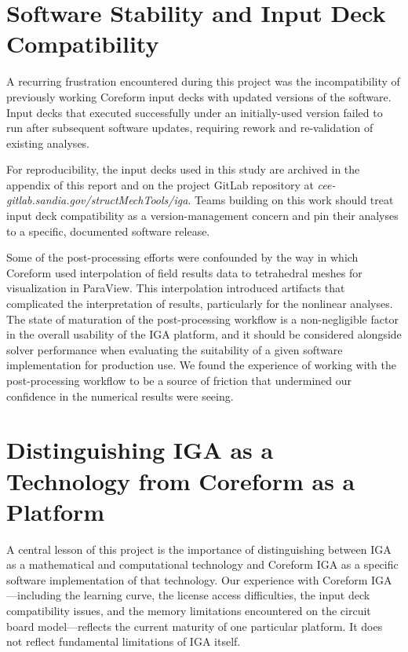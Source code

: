 \documentclass[12pt,report,justified]{SANDreport}
\begin{document}
\section{Software Stability and Input Deck Compatibility}

A recurring frustration encountered during this project was the incompatibility of
previously working Coreform input decks with updated versions of the software.  Input
decks that executed successfully under an initially-used version
failed to run after
subsequent software updates, requiring rework and re-validation of existing analyses.

For reproducibility, the input decks used in this study are archived in the appendix of
this report and on the project GitLab repository at
{\em cee-gitlab.sandia.gov/structMechTools/iga}.  Teams building on this work should
treat input deck compatibility as a version-management concern and pin their analyses to
a specific, documented software release.

Some of the post-processing efforts were confounded by the way in which Coreform used interpolation of field results data to tetrahedral meshes for visualization in ParaView.  This interpolation introduced artifacts that complicated the interpretation of results, particularly for the nonlinear analyses.  The state of maturation of the post-processing workflow is a non-negligible factor in the overall usability of the IGA platform, and it should be considered alongside solver performance when evaluating the suitability of a given software implementation for production use.  We found the experience of working with the post-processing workflow to be a source of friction that undermined our confidence in the numerical results were seeing.

\section{Distinguishing IGA as a Technology from Coreform as a Platform}

A central lesson of this project is the importance of distinguishing between IGA as a
mathematical and computational technology and Coreform IGA as a specific software
implementation of that technology.  Our experience with Coreform IGA---including the
learning curve, the license access difficulties, the input deck compatibility issues,
and the memory limitations encountered on the circuit board model---reflects the current
maturity of one particular platform.  It does not reflect fundamental limitations of IGA
itself.
\end{document}
